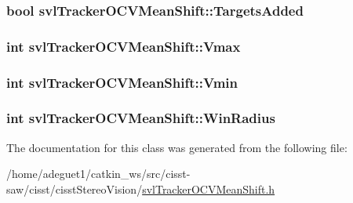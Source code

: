 \hypertarget{classsvl_tracker_o_c_v_mean_shift_a2054ed2ac9e61dc68e1c8d5733452e38}{
\subsubsection[{Targets\-Added}]{\setlength{\rightskip}{0pt plus 5cm}bool svl\-Tracker\-O\-C\-V\-Mean\-Shift\-::\-Targets\-Added\hspace{0.3cm}{\ttfamily [protected]}}}\label{classsvl_tracker_o_c_v_mean_shift_a2054ed2ac9e61dc68e1c8d5733452e38}
\hypertarget{classsvl_tracker_o_c_v_mean_shift_aa30ea527e09f1642723f72b8052c4128}{
\subsubsection[{Vmax}]{\setlength{\rightskip}{0pt plus 5cm}int svl\-Tracker\-O\-C\-V\-Mean\-Shift\-::\-Vmax\hspace{0.3cm}{\ttfamily [protected]}}}\label{classsvl_tracker_o_c_v_mean_shift_aa30ea527e09f1642723f72b8052c4128}
\hypertarget{classsvl_tracker_o_c_v_mean_shift_a819979074decd36baa5f75e0db95764b}{
\subsubsection[{Vmin}]{\setlength{\rightskip}{0pt plus 5cm}int svl\-Tracker\-O\-C\-V\-Mean\-Shift\-::\-Vmin\hspace{0.3cm}{\ttfamily [protected]}}}\label{classsvl_tracker_o_c_v_mean_shift_a819979074decd36baa5f75e0db95764b}
\hypertarget{classsvl_tracker_o_c_v_mean_shift_a33e7390d7ed52a9a2f784ac7bf6a7c56}{
\subsubsection[{Win\-Radius}]{\setlength{\rightskip}{0pt plus 5cm}int svl\-Tracker\-O\-C\-V\-Mean\-Shift\-::\-Win\-Radius\hspace{0.3cm}{\ttfamily [protected]}}}\label{classsvl_tracker_o_c_v_mean_shift_a33e7390d7ed52a9a2f784ac7bf6a7c56}


The documentation for this class was generated from the following file\-:\begin{DoxyCompactItemize}
\item 
/home/adeguet1/catkin\-\_\-ws/src/cisst-\/saw/cisst/cisst\-Stereo\-Vision/\hyperlink{svl_tracker_o_c_v_mean_shift_8h}{svl\-Tracker\-O\-C\-V\-Mean\-Shift.\-h}\end{DoxyCompactItemize}
